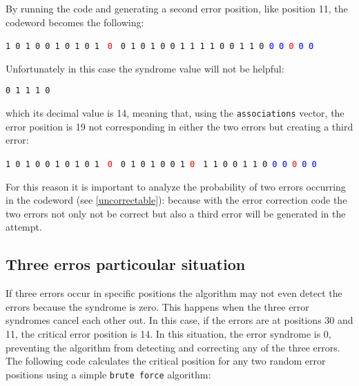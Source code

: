 \noindent By running the code and generating a second error position, like position 11, the codeword becomes the following:

\begin{center}
    \texttt{1 0 1 0 0 1 0 1 0 1 } \textcolor{red}{\texttt{0 }} \texttt{0 1 0 1 0 0 1 1 1 1 0 0 1 1 0 }\textcolor{blue}{\texttt{0 0 }}\textcolor{red}{\texttt{0 }}\textcolor{blue}{\texttt{0 0}}
\end{center}

\noindent Unfortunately in this case the syndrome value will not be helpful:

\begin{center}
    \texttt{0 1 1 1 0}
\end{center}

\noindent which its decimal value is 14, meaning that, using the \texttt{associations} vector, the error position is 19 not corresponding in either the two errors but creating a third error:
\begin{center}
    \texttt{1 0 1 0 0 1 0 1 0 1 } \textcolor{red}{\texttt{0 }} \texttt{0 1 0 1 0 0 1 }\textcolor{red}{\texttt{0 }} \texttt{1 1 0 0 1 1 0 }\textcolor{blue}{\texttt{0 0 }}\textcolor{red}{\texttt{0 }}\textcolor{blue}{\texttt{0 0}}
\end{center}

\noindent For this reason it is important to analyze the probability of two errors occurring in the codeword (see \ref{uncorrectable}): because with the error correction code the two errors not only not be correct but also a third error will be generated in the attempt.

\subsection*{Three erros particoular situation}
If three errors occur in specific positions the algorithm may not even detect the errors because the syndrome is zero. This happens when the three error syndromes cancel each other out. In this case, if the errors are at positions 30 and 11, the critical error position is 14. In this situation, the error syndrome is 0, preventing the algorithm from detecting and correcting any of the three errors. The following code calculates the critical position for any two random error positions using a simple \texttt{brute force} algorithm:

